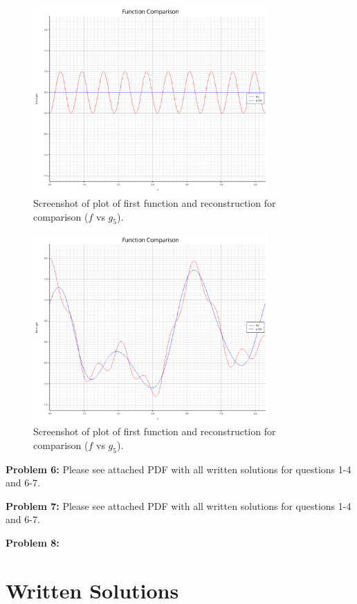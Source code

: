 \documentclass[12pt, letterpaper]{article}
\theoremstyle{nonumberplain}
\begin{document}
\begin{figure}[!htbp]
	\centering
	\includegraphics[width=0.8\textwidth]{first-func-plot.png}
	\caption{Screenshot of plot of first function and reconstruction for comparison ($f$ vs $g_5$).}
\end{figure}

\begin{figure}[!htbp]
	\centering
	\includegraphics[width=0.8\textwidth]{second-func-plot.png}
	\caption{Screenshot of plot of first function and reconstruction for comparison ($f$ vs $g_5$).}
\end{figure}


\clearpage

\hspace{18pt}\textbf{Problem 6:} \medskip
Please see attached PDF with all written solutions for questions 1-4 and 6-7.

\hspace{18pt}\textbf{Problem 7:} \medskip
Please see attached PDF with all written solutions for questions 1-4 and 6-7.

\hspace{18pt}\textbf{Problem 8:} \medskip

\clearpage

\section{Written Solutions}

\end{document}
